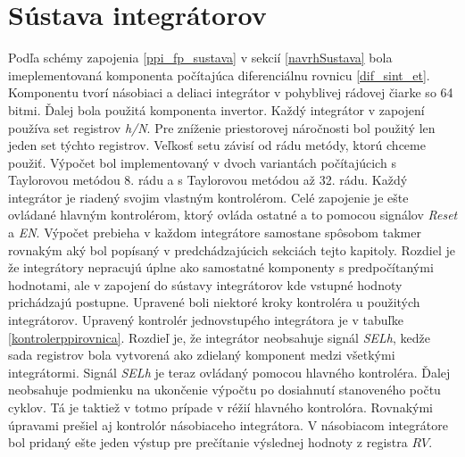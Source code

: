 \section{Sústava integrátorov} \label{impl_rovnice}
Podľa schémy zapojenia  \ref{ppi_fp_sustava} v sekcií \ref{navrhSustava} bola imeplementovaná komponenta počítajúca diferenciálnu rovnicu \ref{dif_sint_et}. Komponentu tvorí násobiaci a deliaci integrátor v pohyblivej rádovej čiarke so 64 bitmi. Ďalej bola použitá komponenta invertor. Každý integrátor v zapojení používa set registrov \textit{h/N}. Pre zníženie priestorovej náročnosti bol použitý len jeden set týchto registrov. Veľkosť setu závisí od rádu metódy, ktorú chceme použiť. Výpočet bol implementovaný v dvoch variantách počítajúcich s Taylorovou metódou 8. rádu a s Taylorovou metódou až 32. rádu.
Každý integrátor je riadený svojim vlastným kontrolérom. Celé zapojenie je ešte ovládané hlavným kontrolérom, ktorý ovláda ostatné a to pomocou signálov \textit{Reset} a \textit{EN}. Výpočet prebieha v každom integrátore samostane spôsobom takmer rovnakým aký bol popísaný v predchádzajúcich sekciách tejto kapitoly. Rozdiel je že integrátory nepracujú úplne ako samostatné komponenty s predpočítanými hodnotami, ale v zapojení do sústavy integrátorov kde vstupné hodnoty prichádzajú postupne. Upravené boli niektoré kroky kontroléra u použitých integrátorov. Upravený kontrolér jednovstupého integrátora je v tabuľke \ref{kontrolerppirovnica}. Rozdieľ je, že  integrátor neobsahuje signál \textit{SELh}, kedže sada registrov bola vytvorená ako zdielaný komponent medzi všetkými integrátormi. Signál \textit{SELh} je teraz ovládaný pomocou hlavného kontroléra. Ďalej neobsahuje podmienku na ukončenie výpočtu po dosiahnutí stanoveného počtu cyklov. Tá je  taktiež v totmo prípade v réžií hlavného kontrolóra. Rovnakými úpravami prešiel aj kontrolór násobiaceho integrátora. V násobiacom integrátore bol pridaný ešte jeden výstup pre prečítanie výslednej hodnoty z registra $ RV $. 


